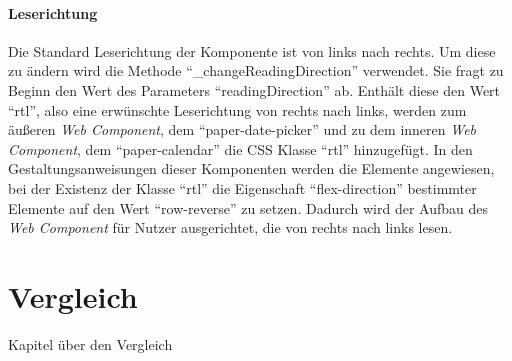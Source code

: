 \documentclass[12pt, paper=a4, bibtotoc, toc=listof, headsepline=true]{scrreprt}
\begin{document}
		\subsubsection{Leserichtung}
		Die Standard Leserichtung der Komponente ist von links nach rechts. Um diese zu ändern wird die Methode \enquote{\_changeReadingDirection} verwendet. Sie fragt zu Beginn den Wert des Parameters \enquote{readingDirection} ab.  Enthält diese den Wert \enquote{rtl}, also eine erwünschte Leserichtung von rechts nach links, werden zum äußeren \emph{Web Component}, dem \enquote{paper-date-picker} und zu dem inneren \emph{Web Component}, dem \enquote{paper-calendar} die \ac{CSS} Klasse \enquote{rtl} hinzugefügt. In den Gestaltungsanweisungen dieser Komponenten werden die Elemente angewiesen, bei der Existenz der Klasse \enquote{rtl} die Eigenschaft \enquote{flex-direction} bestimmter Elemente auf den Wert \enquote{row-reverse} zu setzen. Dadurch wird der Aufbau des \emph{Web Component} für Nutzer ausgerichtet, die von rechts nach links lesen.

\chapter{Vergleich}
Kapitel über den Vergleich
	

	\printbibliography
\end{document}
